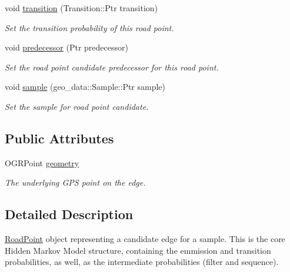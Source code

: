 \begin{DoxyCompactItemize}
void \hyperlink{classhmm__mm_1_1RoadPoint_abd5f4616b4dca5ef1cca75f47d0eedc4}{transition} (Transition\+::\+Ptr transition)
\begin{DoxyCompactList}\small\item\em Set the transition probability of this road point. \end{DoxyCompactList}\item 
void \hyperlink{classhmm__mm_1_1RoadPoint_aad18f6ce7c60bc0463c95eb422db0186}{predecessor} (Ptr predecessor)
\begin{DoxyCompactList}\small\item\em Set the road point candidate predecessor for this road point. \end{DoxyCompactList}\item 
void \hyperlink{classhmm__mm_1_1RoadPoint_ae65ef9e2e3431635ac642a4b1e74fab1}{sample} (geo\+\_\+data\+::\+Sample\+::\+Ptr sample)
\begin{DoxyCompactList}\small\item\em Set the sample for road point candidate. \end{DoxyCompactList}\end{DoxyCompactItemize}
\subsection*{Public Attributes}
\begin{DoxyCompactItemize}
\item 
O\+G\+R\+Point \hyperlink{classhmm__mm_1_1RoadPoint_a32bff153ce045acad8912b43ec2660e7}{geometry}\hypertarget{classhmm__mm_1_1RoadPoint_a32bff153ce045acad8912b43ec2660e7}{}\label{classhmm__mm_1_1RoadPoint_a32bff153ce045acad8912b43ec2660e7}

\begin{DoxyCompactList}\small\item\em The underlying G\+PS point on the edge. \end{DoxyCompactList}\end{DoxyCompactItemize}


\subsection{Detailed Description}
\hyperlink{classhmm__mm_1_1RoadPoint}{Road\+Point} object representing a candidate edge for a sample. This is the core Hidden Markov Model structure, containing the emmission and transition probabilities, as well, as the intermediate probabilities (filter and sequence). 

